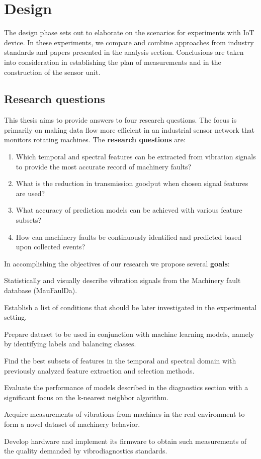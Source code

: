 \chapter{Design} \label{chapter:design}
The design phase sets out to elaborate on the scenarios for experiments with IoT device. In these experiments, we compare and combine approaches from industry standards and papers presented in the analysis section. Conclusions are taken into consideration in establishing the plan of measurements and in the construction of the sensor unit.

\section{Research questions}
This thesis aims to provide answers to four research questions. The focus is primarily on making data flow more efficient in an industrial sensor network that monitors rotating machines. The \textbf{research questions} are:
\begin{enumerate}[label=RQ\arabic*., font=\bfseries]
    \itemsep0pt
	\item Which temporal and spectral features can be extracted from vibration signals to provide the most accurate record of machinery faults?
	\item What is the reduction in transmission goodput when chosen signal features are used?
	\item What accuracy of prediction models can be achieved with various feature subsets?
	\item How can machinery faults be continuously identified and predicted based upon collected events?
\end{enumerate}

\noindent In accomplishing the objectives of our research we propose several \textbf{goals}:
\begin{todolist}
    \itemsep0pt
    \item Statistically and visually describe vibration signals from the Machinery fault database (MauFaulDa).
    \item Establish a list of conditions that should be later investigated in the experimental setting.
    \item Prepare dataset to be used in conjunction with machine learning models, namely by identifying labels and balancing classes.
    \item Find the best subsets of features in the temporal and spectral domain with previously analyzed feature extraction and selection methods.
    \item Evaluate the performance of models described in the diagnostics section with a significant focus on the k-nearest neighbor algorithm.
    \item Acquire measurements of vibrations from machines in the real environment to form a novel dataset of machinery behavior.
    \item Develop hardware and implement its firmware to obtain such measurements of the quality demanded by vibrodiagnostics standards.
\end{todolist}

